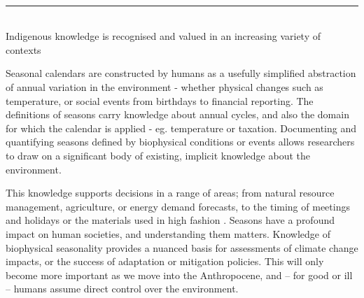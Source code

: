 ~\\ \hrule ~\\




Indigenous knowledge is recognised and valued in an increasing variety
of contexts \citep[eg.][]{petheram2010,cochran2015,berkes2012}











Seasonal calendars are constructed by humans as a usefully simplified
abstraction of annual variation in the environment - whether physical
changes such as temperature, or social events from birthdays to financial
reporting.  The definitions of seasons carry knowledge about annual cycles,
and also the domain for which the calendar is applied - eg. temperature
or taxation.
%
Documenting and quantifying seasons defined by biophysical conditions
or events allows researchers to draw on a significant body of existing,
implicit knowledge about the environment.

This knowledge supports decisions in a range of areas; from natural
resource management, agriculture, or energy demand forecasts, to
the timing of meetings and holidays or the materials used in high fashion .
Seasons have a profound impact on human societies, and understanding
them matters.  Knowledge of biophysical seasonality provides a nuanced
basis for assessments of climate change impacts, or the success of
adaptation or mitigation policies.  This will only become more important
as we move into the Anthropocene, and -- for good or ill -- humans assume
direct control over the environment.


